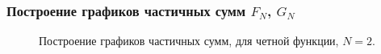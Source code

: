 \documentclass[a5paper, 10pt]{article}
\theoremstyle{definition}
\theoremstyle{plain}
\theoremstyle{remark}
\begin{document}
\subsubsection{Построение графиков частичных сумм $F_N$, $G_N$}

\begin{figure}[h]
\begin{minipage}[h]{0.5\linewidth}
\end{minipage}
\hfill
\begin{minipage}[h]{0.5\linewidth}
\end{minipage}
\caption{Построение графиков частичных сумм, для четной функции, $N=2$.}
\vfill


\end{figure}
\end{document}
